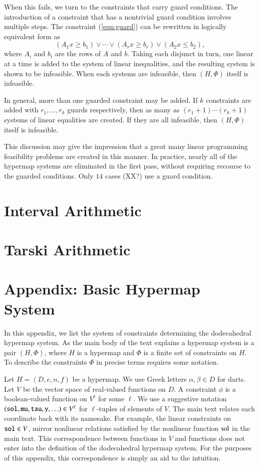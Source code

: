 When this fails, we turn to the constraints that carry guard
conditions.
The introduction of a constraint that has a nontrivial guard condition
involves multiple steps.  
The constraint (\ref{eqn:guard}) can be rewritten in logically
equivalent form as
  $$
   (A_{1} x \ge b_{1}) \lor \cdots \lor
   (A_{r} x \ge b_{r}) \lor (A_2 x \le b_2),
  $$
where $A_{i}$ and $b_{i}$ are the rows of $A$ and $b$.
Taking each disjunct in turn, one linear at a time
is added to the system
of linear inequalities, and the resulting system is shown to be
infeasible.  When each
systems are infeasible, then $(H,\Phi)$ itself is infeasible.

In general, more than one guarded constraint may be added.  If
$k$ constraints are added with $r_1,\ldots,r_k$ guards
respectively, then as many as $(r_1+1)\cdots (r_k+1)$ systems
of linear equalities are created.  If they are all infeasible,
then $(H,\Phi)$ itself is infeasible.

This discussion may give the impression 
that a great many linear programming feasibility
problems are created in this manner.  In practice, nearly all
of the hypermap systems are eliminated in the first pass, without
requiring recourse to the guarded conditions.  Only
$14$ cases (XX?) use a guard condition.




\section{Interval Arithmetic}

\section{Tarski Arithmetic}


\section{Appendix: Basic Hypermap System}

In this appendix, we list the system of constraints determining
the dodecahedral hypermap system.  As the main body of the text explains
a hypermap system is a pair $(H,\Phi)$, where $H$ is a hypermap
and $\Phi$ is a finite set of constraints on $H$.  To describe
the constraints $\Phi$ in precise terms requires some notation.

Let $H=(D,e,n,f)$ be a hypermap.  We use Greek letters
$\alpha,\beta \in D$ for darts.  Let $V$ be the vector space 
of real-valued  functions on $D$.  A constraint $\phi$ is a boolean-valued function on $V^\ell$ for some $\ell$.  We use a suggestive
notation $({\operatorname{{\texttt{sol}}}},{\operatorname{{\texttt{mu}}}},{\operatorname{{\texttt{tau}}}},{\operatorname{{\texttt{y}}}},\ldots)\in V^\ell$ for $\ell$-tuples
of elements of $V$.  The main text relates each coordinate back
with its namesake.  For example, the linear constraints on
${\operatorname{{\texttt{sol}}}}\in V$, mirror  nonlinear relations satisfied by the
nonlinear function $\operatorname{sol}$ in the main text.  This correspondence
between functions in $V$ and functions does not enter into the
definition of the dodecahedral hypermap system.  For the purposes of this
appendix, this correspondence is simply an aid to the
intuition.

